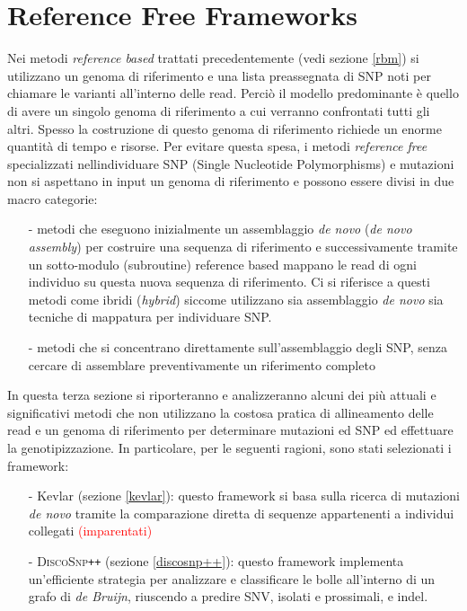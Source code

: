 \documentclass[../main.tex]{subfiles}
\begin{document}
\section{Reference Free Frameworks}
\label{rfm}

Nei metodi \textit{reference based} trattati precedentemente (vedi sezione \ref{rbm}) si utilizzano un genoma di riferimento e una lista preassegnata di SNP noti per chiamare le varianti all'interno delle read. Perciò il modello predominante è quello di avere un singolo genoma di riferimento a cui verranno confrontati tutti gli altri. Spesso la costruzione di questo genoma di riferimento richiede un enorme quantità di tempo e risorse. Per evitare questa spesa, i metodi \textit{reference free} specializzati nell\textquotesingle individuare SNP (Single Nucleotide Polymorphisms) e mutazioni non si aspettano in input un genoma di riferimento e possono essere divisi in due macro categorie:

\begin{itemize} 
\item[-] metodi che eseguono inizialmente un assemblaggio \textit{de novo} (\textit{de novo assembly}) per costruire una sequenza di riferimento e successivamente tramite un sotto-modulo (subroutine) reference based mappano le read di ogni individuo su questa nuova sequenza di riferimento. Ci si riferisce a questi metodi come ibridi (\textit{hybrid}) siccome utilizzano sia assemblaggio \textit{de novo} sia tecniche di mappatura per individuare SNP.
\item[-] metodi che si concentrano direttamente sull’assemblaggio degli SNP, senza cercare di assemblare preventivamente un riferimento completo
\end{itemize}

In questa terza sezione si riporteranno e analizzeranno alcuni dei più attuali e significativi metodi che non utilizzano la costosa pratica di allineamento delle read e un genoma di riferimento per determinare mutazioni ed SNP ed effettuare la genotipizzazione. In particolare, per le seguenti ragioni, sono stati selezionati i framework:
\begin{itemize} 
\item[-] Kevlar (sezione \ref{kevlar}): questo framework \cite{standage2019kevlar} si basa sulla ricerca di mutazioni \textit{de novo} tramite la comparazione diretta di sequenze appartenenti a individui collegati \textcolor{red}{(imparentati)}
\item[-] \textsc{DiscoSnp}\texttt{++} (sezione \ref{discosnp++}): questo framework \cite{peterlongo2017discosnp++} implementa un'efficiente strategia per analizzare e classificare le bolle all'interno di un grafo di \textit{de Bruijn}, riuscendo a predire SNV, isolati e prossimali, e indel.
\end{itemize}
\end{document}
